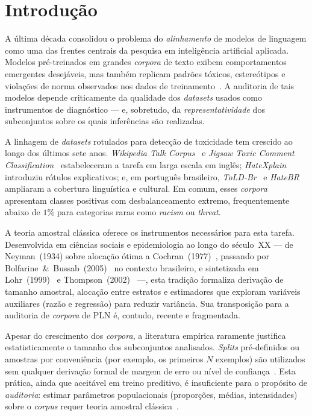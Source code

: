 \section{Introdução}
\label{sec:intro}

A última década consolidou o problema do \textit{alinhamento} de modelos de
linguagem como uma das frentes centrais da pesquisa em inteligência artificial
aplicada. Modelos pré-treinados em grandes \textit{corpora} de texto exibem
comportamentos emergentes desejáveis, mas também replicam padrões tóxicos,
estereótipos e violações de norma observados nos dados de
treinamento~\cite{bender2021,gehman2020}. A auditoria de tais modelos depende
criticamente da qualidade dos \textit{datasets} usados como instrumentos de
diagnóstico --- e, sobretudo, da \textit{representatividade} dos subconjuntos
sobre os quais inferências são realizadas.

A linhagem de \textit{datasets} rotulados para detecção de toxicidade tem
crescido ao longo dos últimos sete anos. \textit{Wikipedia Talk
Corpus}~\cite{wulczyn2017} e \textit{Jigsaw Toxic Comment
Classification}~\cite{borkan2019nuanced} estabeleceram a tarefa em larga
escala em inglês; \textit{HateXplain}~\cite{mathew2021} introduziu rótulos
explicativos; e, em português brasileiro, \textit{ToLD-Br}~\cite{leite2020} e
\textit{HateBR}~\cite{vargas2022hatebr} ampliaram a cobertura linguística e
cultural. Em comum, esses \textit{corpora} apresentam classes positivas com
desbalanceamento extremo, frequentemente abaixo de $1\%$ para categorias raras
como \textit{racism} ou \textit{threat}.

A teoria amostral clássica oferece os instrumentos necessários para esta
tarefa. Desenvolvida em ciências sociais e epidemiologia ao longo do
século~XX --- de Neyman~(1934) sobre alocação ótima a
Cochran~(1977)~\cite{cochran1977}, passando por
Bolfarine~\&~Bussab~(2005)~\cite{bolfarine2005} no contexto brasileiro, e
sintetizada em
Lohr~(1999)~\cite{lohr1999} e Thompson~(2002)~\cite{thompson2002} ---, esta
tradição formaliza derivação de tamanho amostral, alocação entre estratos e
estimadores que exploram variáveis auxiliares (razão e regressão) para
reduzir variância. Sua transposição para a auditoria de \textit{corpora} de
PLN é, contudo, recente e fragmentada.

Apesar do crescimento dos \textit{corpora}, a literatura empírica raramente
justifica estatisticamente o tamanho dos subconjuntos analisados.
\textit{Splits} pré-definidos ou amostras por conveniência (por exemplo, os
primeiros $N$ exemplos) são utilizados sem qualquer derivação formal de
margem de erro ou nível de confiança~\cite{leite2020,vargas2022hatebr}. Esta
prática, ainda que aceitável em treino preditivo, é insuficiente para o
propósito de \textit{auditoria}: estimar parâmetros populacionais (proporções,
médias, intensidades) sobre o \textit{corpus} requer teoria amostral
clássica~\cite{cochran1977,bolfarine2005,lohr1999,thompson2002}.

